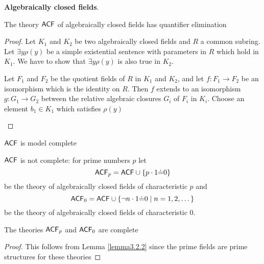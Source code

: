 \documentclass[11pt]{article}
\begin{document}
\textbf{Algebraically closed fields}.
\begin{theorem}[Tarski]
The theory \(\operatorname{\textsf{ACF}}\) of algebraically closed fields has quantifier elimination
\end{theorem}

\begin{proof}
Let \(K_1\) and \(K_2\) be two algebraically closed fields and \(R\) a common
subring. Let \(\exists y\rho(y)\) be a simple existential sentence with
parameters in \(R\) which hold in \(K_1\). We have to show that \(\exists
   y\rho(y)\) is also true in \(K_2\).

Let \(F_1\) and \(F_2\) be the quotient fields of \(R\) in \(K_1\) and
\(K_2\), and let \(f:F_1\to F_2\) be an isomorphism which is the identity on
\(R\). Then \(f\) extends to an isomorphism \(g:G_1\to G_2\) between the
relative algebraic closures \(G_i\) of \(F_i\) in \(K_i\). Choose an element \(b_1\in K_1\) which
satisfies \(\rho(y)\)

\begin{center}\end{center}
\end{proof}

\begin{corollary}[]
\(\textsf{ACF}\) is model complete
\end{corollary}

\(\textsf{ACF}\) is not complete: for prime numbers \(p\) let
\begin{equation*}
\textsf{ACF}_p=\textsf{ACF}\cup\{p\cdot 1\dot=0\}
\end{equation*}
be the theory of algebraically closed fields of characteristic \(p\) and
\begin{equation*}
\textsf{ACF}_0=\textsf{ACF}\cup\{\neg n\cdot 1\dot=0\mid n=1,2,\dots\}
\end{equation*}
be the theory of algebraically closed fields of characteristic 0.

\begin{corollary}[]
The theories \(\textsf{ACF}_p\)  and \(\textsf{ACF}_0\) are complete
\end{corollary}

\begin{proof}
This follows from Lemma \ref{lemma3.2.2} since the prime fields are prime structures for these theories
\end{proof}
\end{document}
